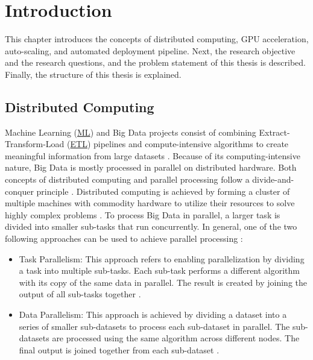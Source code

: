 \chapter{Introduction}
\label{chap:01_introduction}

This chapter introduces the concepts of distributed computing, GPU acceleration, auto-scaling, and automated deployment pipeline.
Next, the research objective and the research questions, and the problem statement of this thesis is described.
Finally, the structure of this thesis is explained.


\section{Distributed Computing}
Machine Learning (\hyperlink{abbr:ml}{ML}) and Big Data projects consist of combining Extract-Transform-Load (\hyperlink{abbr:etl}{ETL}) pipelines and compute-intensive algorithms to create meaningful information from large datasets \cite{Vadapalli2018DevOps}.
Because of its computing-intensive nature, Big Data is mostly processed in parallel on distributed hardware.
Both concepts of distributed computing and parallel processing follow a divide-and-conquer principle \cite{Khattak2016BigData}.
Distributed computing is achieved by forming a cluster of multiple machines with commodity hardware to utilize their resources to solve highly complex problems \cite{Ganelin2016Spark}.
To process Big Data in parallel, a larger task is divided into smaller sub-tasks that run concurrently.
In general, one of the two following approaches can be used to achieve parallel processing \cite{Khattak2016BigData}:
\begin{itemize}
\item Task Parallelism:
This approach refers to enabling parallelization by dividing a task into multiple sub-tasks.
Each sub-task performs a different algorithm with its copy of the same data in parallel.
The result is created by joining the output of all sub-tasks together \cite{Khattak2016BigData}.

\item Data Parallelism:
This approach is achieved by dividing a dataset into a series of smaller sub-datasets to process each sub-dataset in parallel.
The sub-datasets are processed using the same algorithm across different nodes.
%
The final output is joined together from each sub-dataset \cite{Khattak2016BigData}.
\end{itemize}
